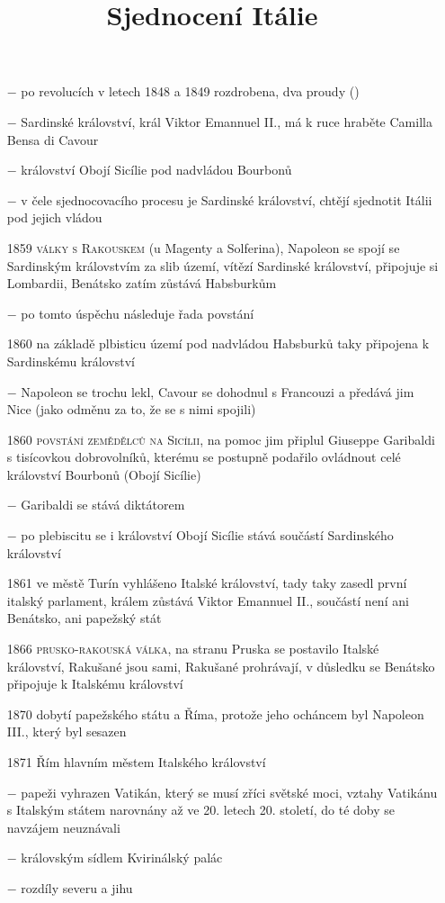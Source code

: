\documentclass{article}
\title{\vspace{-2cm}Sjednocení Itálie\vspace{-1.7cm}}
\date{}
\author{}
\begin{document}
\maketitle

\begin{itemize}
    \vspace{-0.5em}
    \setlength\itemsep{0.15em}
    \item[$-$] po revolucích v letech 1848 a 1849 rozdrobena, dva proudy ()
    \item[$-$] Sardinské království, král Viktor Emannuel II., má k ruce hraběte Camilla Bensa di Cavour
    \item[$-$] království Obojí Sicílie pod nadvládou Bourbonů
    \item[$-$]  v čele sjednocovacího procesu je Sardinské království, chtějí sjednotit Itálii pod jejich vládou
    \item[1859] \textsc{války s Rakouskem} (u Magenty a Solferina), Napoleon se spojí se Sardinským královstvím za slib území, vítězí Sardinské království, připojuje si Lombardii, Benátsko zatím zůstává Habsburkům
    \item[$-$] po tomto úspěchu následuje řada povstání
    \item[1860] na základě plbisticu území pod nadvládou Habsburků taky připojena k Sardinskému království
    \item[$-$] Napoleon se trochu lekl, Cavour se dohodnul s Francouzi a předává jim Nice (jako odměnu za to, že se s nimi spojili)
    \item[1860] \textsc{povstání zemědělců na Sicílii}, na pomoc jim připlul Giuseppe Garibaldi s tisícovkou dobrovolníků, kterému se postupně podařilo ovládnout celé království Bourbonů (Obojí Sicílie)
    \item[$-$] Garibaldi se stává diktátorem
    \item[$-$] po plebiscitu se i království Obojí Sicílie stává součástí Sardinského království
    \item[1861] ve městě Turín vyhlášeno Italské království, tady taky zasedl první italský parlament, králem zůstává Viktor Emannuel II., součástí není ani Benátsko, ani papežský stát
    \item[1866] \textsc{prusko-rakouská válka}, na stranu Pruska se postavilo Italské království, Rakušané jsou sami, Rakušané prohrávají, v důsledku se Benátsko připojuje k Italskému království
    \item[1870] dobytí papežského státu a Říma, protože jeho ocháncem byl Napoleon III., který byl sesazen
    \item[1871] Řím hlavním městem Italského království
    \item[$-$] papeži vyhrazen Vatikán, který se musí zříci světské moci, vztahy Vatikánu  s Italským státem narovnány až ve 20. letech 20. století, do té doby se navzájem neuznávali
    \item[$-$] královským sídlem Kvirinálský palác
    \item[$-$] rozdíly severu a jihu
\end{itemize}
\end{document}
